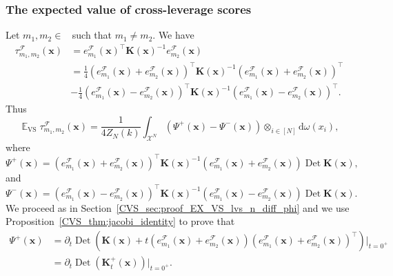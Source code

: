 \documentclass[twoside,11pt]{book}
\numberwithin{theorem}{chapter}
\numberwithin{definition}{chapter}
\numberwithin{proposition}{chapter}
\numberwithin{corollary}{chapter}
\numberwithin{example}{chapter}
\numberwithin{lemma}{chapter}
\numberwithin{assumption}{chapter}
\numberwithin{equation}{chapter}
\numberwithin{figure}{chapter}
\DeclareMathOperator{\Det}{Det}
\DeclareMathOperator{\VS}{\mathrm{VS}}
\DeclareMathOperator{\Tran}{\intercal}
\DeclareMathOperator{\EX}{\mathbb{E}}
\DeclareMathOperator{\F}{\mathcal{F}}
\DeclareMathOperator{\Ns}{\mathbb{N}^{*}}
\newcommand{\rb}[1]{\textcolor{magenta}{#1}}
\begin{document}
\subsubsection{The expected value of cross-leverage scores}
Let $m_{1},m_{2} \in \Ns$ such that $m_{1} \neq m_{2}$. We have
\begin{align}
\tau_{m_{1},m_{2}}^{\F}(\bm{x}) & = e_{m_{1}}^{\mathcal{F}}(\bm{x})^{\Tran}\bm{K}(\bm{x})^{-1}e_{m_{2}}^{\mathcal{F}}(\bm{x}) \nonumber \\
& = \frac{1}{4} \left(e_{m_{1}}^{\mathcal{F}}(\bm{x}) + e_{m_{2}}^{\mathcal{F}}(\bm{x})\right)^{\Tran}\bm{K}(\bm{x})^{-1}\left(e_{m_{1}}^{\mathcal{F}}(\bm{x}) + e_{m_{2}}^{\mathcal{F}}(\bm{x})\right)^{\Tran}  \nonumber \\
& - \frac{1}{4} \left(e_{m_{1}}^{\mathcal{F}}(\bm{x}) - e_{m_{2}}^{\mathcal{F}}(\bm{x})\right)^{\Tran}\bm{K}(\bm{x})^{-1}\left(e_{m_{1}}^{\mathcal{F}}(\bm{x}) - e_{m_{2}}^{\mathcal{F}}(\bm{x})\right)^{\Tran}.
\end{align}
Thus
\begin{equation}
\EX_{\VS} \tau_{m_{1},m_{2}}^{\F}(\bm{x}) = \frac{1}{4 Z_{N}(k)}\int_{\mathcal{X}^{N}} \left( \Psi^{+}(\bm{x}) - \Psi^{-}(\bm{x}) \right) \otimes_{i \in [N]}\mathrm{d}\omega(x_{i}),
\end{equation}
where
\begin{equation}
\Psi^{+}(\bm{x}) = \left(e_{m_{1}}^{\mathcal{F}}(\bm{x})+e_{m_{2}}^{\mathcal{F}}(\bm{x})\right)^{\Tran}\bm{K}(\bm{x})^{-1}\left(e_{m_{1}}^{\mathcal{F}}(\bm{x})+e_{m_{2}}^{\mathcal{F}}(\bm{x})\right) \Det \bm{K}(\bm{x}),
\end{equation}
and
\begin{equation}
\Psi^{-}(\bm{x}) = \left(e_{m_{1}}^{\mathcal{F}}(\bm{x})-e_{m_{2}}^{\mathcal{F}}(\bm{x})\right)^{\Tran}\bm{K}(\bm{x})^{-1}\left(e_{m_{1}}^{\mathcal{F}}(\bm{x})-e_{m_{2}}^{\mathcal{F}}(\bm{x})\right) \Det \bm{K}(\bm{x}).
\end{equation}
We proceed as in Section~\ref{CVS_sec:proof_EX_VS_lvs_n_diff_phi} and we use Proposition~\ref{CVS_thm:jacobi_identity} to prove that
\begin{align}
\Psi^{+}(\bm{x}) & = \partial_{t} \Det \left(\bm{K}(\bm{x})+t \left(e_{m_{1}}^{\mathcal{F}}(\bm{x}) + e_{m_{2}}^{\mathcal{F}}(\bm{x}) \right)\left(e_{m_{1}}^{\mathcal{F}}(\bm{x}) + e_{m_{2}}^{\mathcal{F}}(\bm{x}) \right)^{\Tran}\right)|_{t = 0^{+}} \nonumber \\
& = \partial_{t} \Det \left(\bm{K}_{t}^{+}(\bm{x})\right)|_{t = 0^{+}}.
\end{align}
\end{document}
